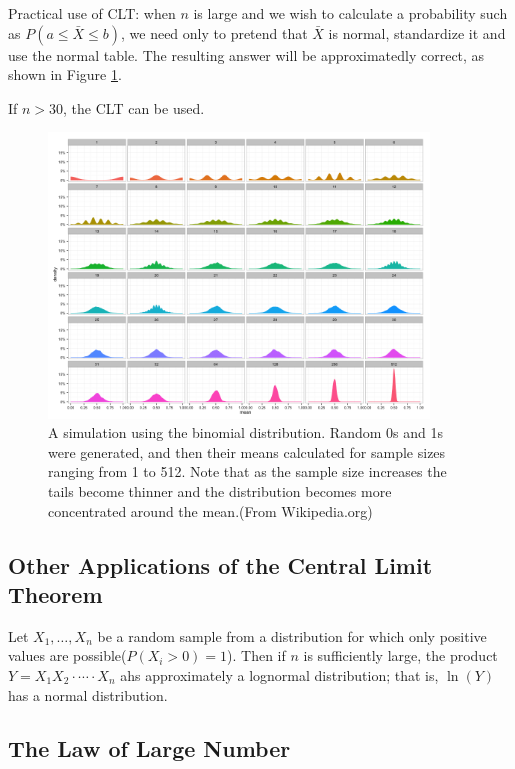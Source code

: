 Practical use of CLT: when $n$ is large and we wish to calculate a probability such as $P(a\leq \bar{X}\leq b)$, we need only to pretend that $\bar{X}$ is normal, standardize it and use the normal table. The resulting answer will be approximatedly correct, as shown in Figure \ref{fig:6-1}.

If $n>30$, the CLT can be used.

\begin{figure}[H]
    \centering
    \includegraphics[width=0.9\textwidth]{img/6-central-limit-theorem.png}
    \caption{A simulation using the binomial distribution. Random 0s and 1s were generated, and then their means calculated for sample sizes ranging from 1 to 512. Note that as the sample size increases the tails become thinner and the distribution becomes more concentrated around the mean.(From Wikipedia.org)}
    \label{fig:6-1}
\end{figure}

\subsection{Other Applications of the Central Limit Theorem}

\begin{proposition}
    Let $X_1,\dots,X_n$ be a random sample from a distribution for which only positive values are possible($P(X_i > 0) = 1$). Then if $n$ is sufficiently large, the product $Y=X_1X_2\cdot\cdots\cdot X_n$ ahs approximately a lognormal distribution; that is, $\ln(Y)$ has a normal distribution.
\end{proposition}

\subsection{The Law of Large Number}

